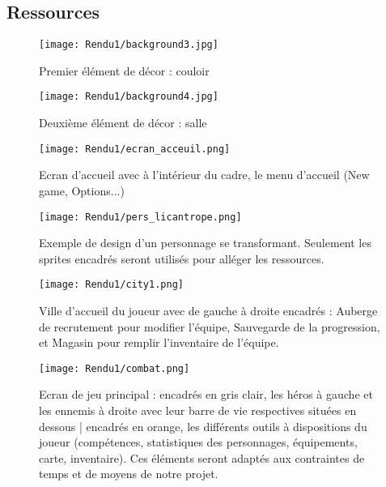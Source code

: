 \documentclass[a4paper,12pt]{article}
\begin{document}
\subsection{Ressources}
\begin{figure}[!ht]
  \centering
  \texttt{[image: Rendu1/background3.jpg]}
  \caption{Premier élément de décor : couloir}
\end{figure}
\begin{figure}[!ht]
  \centering
  \texttt{[image: Rendu1/background4.jpg]}
  \caption{Deuxième élément de décor : salle}
\end{figure}
\begin{figure}[!ht]
  \centering
  \texttt{[image: Rendu1/ecran\_acceuil.png]}
  \caption{Ecran d'accueil avec à l'intérieur du cadre, le menu d'accueil (New game, Options...)}
\end{figure}
\begin{figure}[!ht]
  \centering
  \texttt{[image: Rendu1/pers\_licantrope.png]}
  \caption{Exemple de design d'un personnage se transformant. Seulement les sprites encadrés seront utilisés pour alléger les ressources.}
\end{figure}
\begin{figure}[!ht]
  \centering
  \texttt{[image: Rendu1/city1.png]}
  \caption{Ville d'accueil du joueur avec de gauche à droite encadrés :  Auberge de recrutement pour modifier l'équipe, Sauvegarde de la progression, et Magasin pour remplir l'inventaire de l'équipe.}
\end{figure}
\begin{figure}[!ht]
  \centering
  \texttt{[image: Rendu1/combat.png]}
  \caption{Ecran de jeu principal : encadrés en gris clair, les héros à gauche et les ennemis à droite avec leur barre de vie respectives situées en dessous | encadrés en orange, les différents outils à dispositions du joueur (compétences, statistiques des personnages, équipements, carte, inventaire). Ces éléments seront adaptés aux contraintes de temps et de moyens de notre projet.}
\end{figure}
\end{document}

